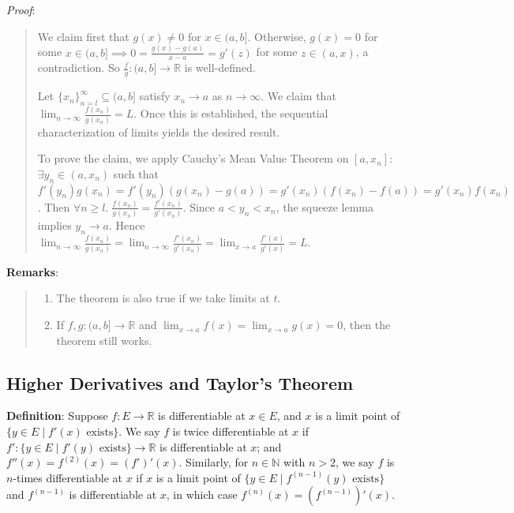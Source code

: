 \documentclass[11pt]{article}
\begin{document}
\emph{Proof}:
\begin{quote}\vspace{-0.3cm}
We claim first that $g(x) \neq 0$ for $x \in (a,b]$. Otherwise, $g(x) = 0$ for some $x \in (a,b] \implies 0 = \frac{g(x) - g(a)}{x-a} = g'(z)$ for some $z \in (a,x)$, a contradiction. So $\frac{f}{g} : (a, b] \to \mathbb{R}$ is well-defined.

Let $\{x_n\}_{n=l}^\infty \subseteq (a,b]$ satisfy $x_n \to a$ as $n \to \infty$. We claim that $\lim_{n \to \infty} \frac{f(x_n)}{g(x_n)} = L$. Once this is established, the sequential characterization of limits yields the desired result.

To prove the claim, we apply Cauchy's Mean Value Theorem on $[a, x_n]$: $\exists y_n \in (a, x_n)$ such that $f'(y_n) g(x_n) = f'(y_n)(g(x_n) - g(a)) = g'(x_n) (f(x_n) - f(a)) = g'(x_n) f(x_n)$. Then $\forall n \geq l.\; \frac{f(x_n)}{g(x_n)} = \frac{f'(x_n)}{g'(x_n)}$. Since $a < y_n < x_n$, the squeeze lemma implies $y_n \to a$. Hence $\lim_{n \to \infty} \frac{f(x_n)}{g(x_n)} = \lim_{n \to \infty} \frac{f'(x_n)}{g'(x_n)} = \lim_{x \to a} \frac{f'(x)}{g'(x)} = L$.
\end{quote}

\textbf{Remarks}:
\begin{quote}\vspace{-0.3cm}
	\begin{enumerate}
	\item The theorem is also true if we take limits at $t$.
	\item If $f,g : (a,b] \to \mathbb{R}$ and $\lim_{x \to a} f(x) = \lim_{x \to a} g(x) = 0$, then the theorem still works.
	\end{enumerate}
\end{quote}

\subsection{Higher Derivatives and Taylor's Theorem}

\textbf{Definition}: Suppose $f : E \to \mathbb{R}$ is differentiable at $x \in E$, and $x$ is a limit point of $\{y \in E \;|\; f'(x) \text{ exists}\}$. We say $f$ is twice differentiable at $x$ if $f' : \{y \in E \;|\; f'(y) \text{ exists}\} \to \mathbb{R}$ is differentiable at $x$; and $f''(x) = f^{(2)}(x) = (f')'(x)$. Similarly, for $n \in \mathbb{N}$ with $n > 2$, we say $f$ is $n$-times differentiable at $x$ if $x$ is a limit point of $\{y \in E \;|\; f^{(n-1)}(y) \text{ exists}\}$ and $f^{(n-1)}$ is differentiable at $x$, in which case $f^{(n)}(x) = (f^{(n-1)})'(x)$.
\end{document}
